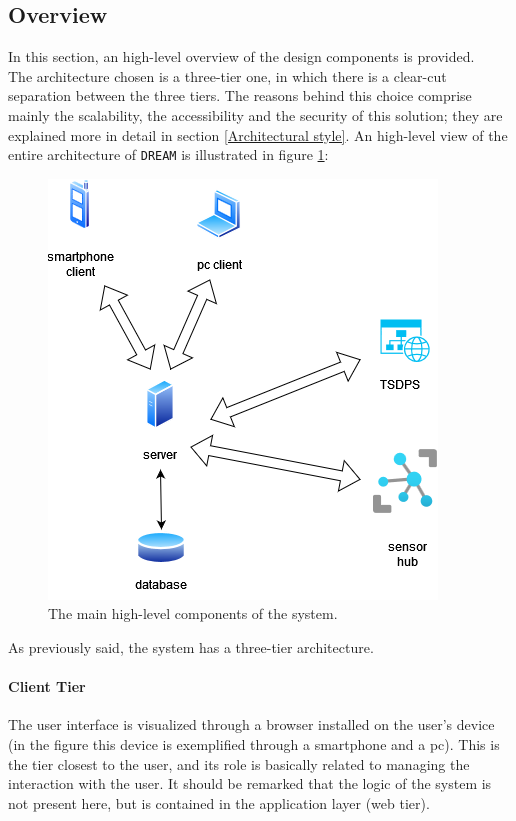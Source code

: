 \documentclass{article}
\begin{document}
\subsection{Overview}
In this section, an high-level overview of the design components is provided.\\
The architecture chosen is a three-tier one, in which there is a clear-cut separation between the three tiers. The reasons behind this choice comprise mainly the scalability, the accessibility and the security of this solution; they are explained more in detail in section \ref{Architectural style}.
An high-level view of the entire architecture of \verb|DREAM| is illustrated in figure \ref{fig:overview}:
\begin{figure}[H]
    \centering
    \includegraphics[scale=0.5]{diagrams/overview.png}
    \caption{The main high-level components of the system.}
    \label{fig:overview}
\end{figure}
As previously said, the system has a three-tier architecture.
\paragraph{Client Tier}
The user interface is visualized through a browser installed on the user's device (in the figure this device is exemplified through a smartphone and a pc). This is the tier closest to the user, and its role is basically related to managing the interaction with the user. It should be remarked that the logic of the system is not present here, but is contained in the application layer (web tier).
\end{document}

